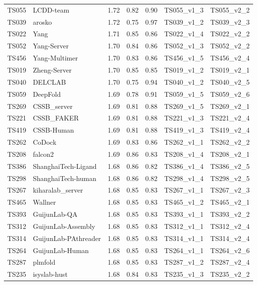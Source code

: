 \begin{longtable}{lllllll}
TS055 & LCDD-team & 1.72 & 0.82 & 0.90 & TS055\_v1\_3 & TS055\_v2\_2 \\ 
TS039 & arosko & 1.72 & 0.75 & 0.97 & TS039\_v1\_2 & TS039\_v2\_3 \\ 
TS022 & Yang & 1.71 & 0.85 & 0.86 & TS022\_v1\_4 & TS022\_v2\_2 \\ 
TS052 & Yang-Server & 1.70 & 0.84 & 0.86 & TS052\_v1\_3 & TS052\_v2\_2 \\ 
TS456 & Yang-Multimer & 1.70 & 0.83 & 0.86 & TS456\_v1\_5 & TS456\_v2\_4 \\ 
TS019 & Zheng-Server & 1.70 & 0.85 & 0.85 & TS019\_v1\_2 & TS019\_v2\_1 \\ 
TS040 & DELCLAB & 1.70 & 0.75 & 0.94 & TS040\_v1\_2 & TS040\_v2\_5 \\ 
TS059 & DeepFold & 1.69 & 0.78 & 0.91 & TS059\_v1\_5 & TS059\_v2\_6 \\ 
TS269 & CSSB\_server & 1.69 & 0.81 & 0.88 & TS269\_v1\_5 & TS269\_v2\_1 \\ 
TS221 & CSSB\_FAKER & 1.69 & 0.81 & 0.88 & TS221\_v1\_3 & TS221\_v2\_4 \\ 
TS419 & CSSB-Human & 1.69 & 0.81 & 0.88 & TS419\_v1\_3 & TS419\_v2\_4 \\ 
TS262 & CoDock & 1.69 & 0.83 & 0.86 & TS262\_v1\_1 & TS262\_v2\_2 \\ 
TS208 & falcon2 & 1.69 & 0.86 & 0.83 & TS208\_v1\_4 & TS208\_v2\_1 \\ 
TS386 & ShanghaiTech-Ligand & 1.68 & 0.86 & 0.82 & TS386\_v1\_4 & TS386\_v2\_5 \\ 
TS298 & ShanghaiTech-human & 1.68 & 0.86 & 0.82 & TS298\_v1\_4 & TS298\_v2\_5 \\ 
TS267 & kiharalab\_server & 1.68 & 0.85 & 0.83 & TS267\_v1\_1 & TS267\_v2\_3 \\ 
TS465 & Wallner & 1.68 & 0.85 & 0.83 & TS465\_v1\_2 & TS465\_v2\_1 \\ 
TS393 & GuijunLab-QA & 1.68 & 0.85 & 0.83 & TS393\_v1\_1 & TS393\_v2\_2 \\ 
TS312 & GuijunLab-Assembly & 1.68 & 0.85 & 0.83 & TS312\_v1\_1 & TS312\_v2\_4 \\ 
TS314 & GuijunLab-PAthreader & 1.68 & 0.85 & 0.83 & TS314\_v1\_1 & TS314\_v2\_4 \\ 
TS264 & GuijunLab-Human & 1.68 & 0.85 & 0.83 & TS264\_v1\_1 & TS264\_v2\_6 \\ 
TS287 & plmfold & 1.68 & 0.85 & 0.83 & TS287\_v1\_2 & TS287\_v2\_4 \\ 
TS235 & isyslab-hust & 1.68 & 0.84 & 0.83 & TS235\_v1\_3 & TS235\_v2\_2 \\ 

\end{longtable}
